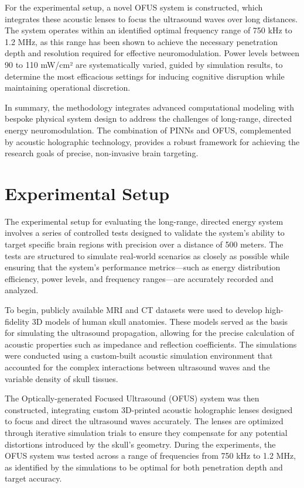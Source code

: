 \documentclass{article}
\begin{document}
For the experimental setup, a novel OFUS system is constructed, which integrates these acoustic lenses to focus the ultrasound waves over long distances. The system operates within an identified optimal frequency range of 750 kHz to 1.2 MHz, as this range has been shown to achieve the necessary penetration depth and resolution required for effective neuromodulation. Power levels between 90 to 110 mW/cm² are systematically varied, guided by simulation results, to determine the most efficacious settings for inducing cognitive disruption while maintaining operational discretion.

In summary, the methodology integrates advanced computational modeling with bespoke physical system design to address the challenges of long-range, directed energy neuromodulation. The combination of PINNs and OFUS, complemented by acoustic holographic technology, provides a robust framework for achieving the research goals of precise, non-invasive brain targeting.

\section{Experimental Setup}
The experimental setup for evaluating the long-range, directed energy system involves a series of controlled tests designed to validate the system's ability to target specific brain regions with precision over a distance of 500 meters. The tests are structured to simulate real-world scenarios as closely as possible while ensuring that the system's performance metrics—such as energy distribution efficiency, power levels, and frequency ranges—are accurately recorded and analyzed.

To begin, publicly available MRI and CT datasets were used to develop high-fidelity 3D models of human skull anatomies. These models served as the basis for simulating the ultrasound propagation, allowing for the precise calculation of acoustic properties such as impedance and reflection coefficients. The simulations were conducted using a custom-built acoustic simulation environment that accounted for the complex interactions between ultrasound waves and the variable density of skull tissues.

The Optically-generated Focused Ultrasound (OFUS) system was then constructed, integrating custom 3D-printed acoustic holographic lenses designed to focus and direct the ultrasound waves accurately. The lenses are optimized through iterative simulation trials to ensure they compensate for any potential distortions introduced by the skull's geometry. During the experiments, the OFUS system was tested across a range of frequencies from 750 kHz to 1.2 MHz, as identified by the simulations to be optimal for both penetration depth and target accuracy.
\end{document}
